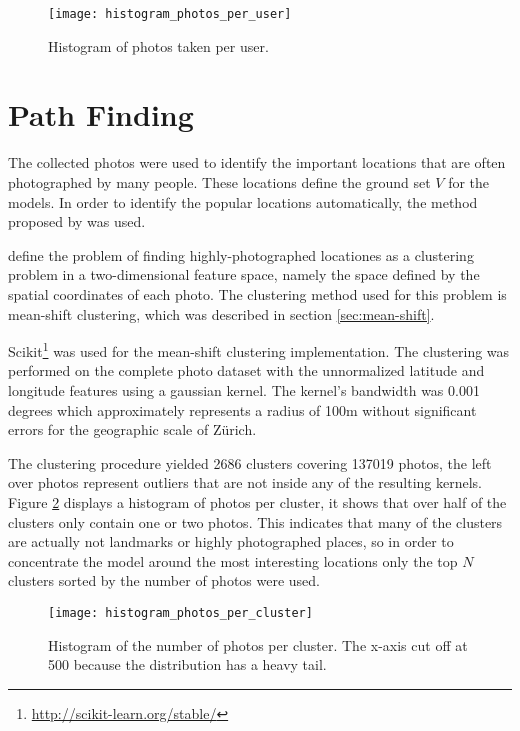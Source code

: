 \begin{figure}
  \centering
  \texttt{[image: histogram\_photos\_per\_user]}
  \caption{Histogram of photos taken per user.}
  \label{fig:photo_user_distribution}
\end{figure}

\section{Path Finding}
\label{sec:path_discovery}

The collected photos were used to identify the important locations that are often photographed by many people. These locations define the ground set $V$ for the models. In order to identify the popular locations automatically, the method proposed by \citet{Kleinberg2009} was used.

\citet{Kleinberg2009} define the problem of finding highly-photographed locationes as a clustering problem in a two-dimensional feature space, namely the space defined by the spatial coordinates of each photo. The clustering method used for this problem is mean-shift clustering, which was described in section \ref{sec:mean-shift}.

Scikit\footnote{\url{http://scikit-learn.org/stable/}} was used for the mean-shift clustering implementation. The clustering was performed on the complete photo dataset with the unnormalized latitude and longitude features using a gaussian kernel. The kernel's bandwidth was 0.001 degrees which approximately represents a radius of 100m without significant errors for the geographic scale of Zürich.

The clustering procedure yielded 2686 clusters covering 137019 photos, the left over photos represent outliers that are not inside any of the resulting kernels. Figure \ref{fig:photos_per_clusters} displays a histogram of photos per cluster, it shows that over half of the clusters only contain one or two photos. This indicates that many of the clusters are actually not landmarks or highly photographed places, so in order to concentrate the model around the most interesting locations only the top $N$ clusters sorted by the number of photos were used.

\begin{figure}
  \centering
  \texttt{[image: histogram\_photos\_per\_cluster]}
  \caption{Histogram of the number of photos per cluster. The x-axis cut off at 500 because the distribution has a heavy tail.}
  \label{fig:photos_per_clusters}
\end{figure}

